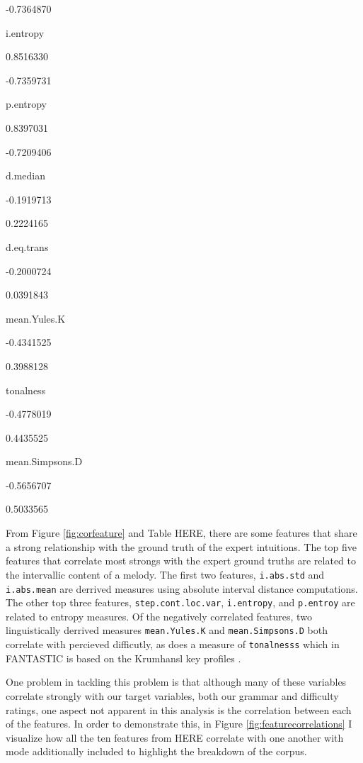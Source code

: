 \documentclass[]{book}
\begin{document}
-0.7364870

i.entropy

0.8516330

-0.7359731

p.entropy

0.8397031

-0.7209406

d.median

-0.1919713

0.2224165

d.eq.trans

-0.2000724

0.0391843

mean.Yules.K

-0.4341525

0.3988128

tonalness

-0.4778019

0.4435525

mean.Simpsons.D

-0.5656707

0.5033565

From Figure \ref{fig:corfeature} and Table HERE, there are some features that share a strong relationship with the ground truth of the expert intuitions.
The top five features that correlate most strongs with the expert ground truths are related to the intervallic content of a melody.
The first two features, \texttt{i.abs.std} and \texttt{i.abs.mean} are derrived measures using absolute interval distance computations.
The other top three features, \texttt{step.cont.loc.var}, \texttt{i.entropy}, and \texttt{p.entroy} are related to entropy measures.
Of the negatively correlated features, two linguistically derrived measures \texttt{mean.Yules.K} and \texttt{mean.Simpsons.D} both correlate with percieved difficutly, as does a measure of \texttt{tonalnesss} which in FANTASTIC is based on the Krumhansl key profiles \citep{krumhanslCognitiveFoundationsMusical2001}.

One problem in tackling this problem is that although many of these variables correlate strongly with our target variables, both our grammar and difficulty ratings, one aspect not apparent in this analysis is the correlation between each of the features.
In order to demonstrate this, in Figure \ref{fig:featurecorrelations} I visualize how all the ten features from HERE correlate with one another with mode additionally included to highlight the breakdown of the corpus.
\end{document}
